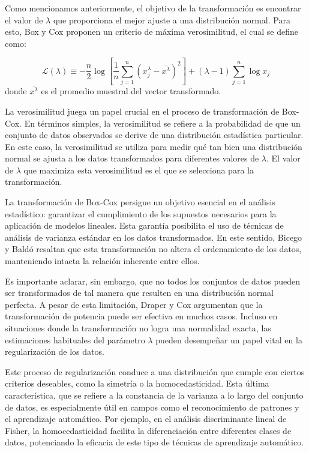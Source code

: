     Como mencionamos anteriormente, el objetivo de la transformaci\'on es encontrar el valor de $\lambda$ que proporciona el mejor ajuste a una distribuci\'on normal. Para esto, Box y Cox proponen un criterio de m\'axima verosimilitud, el cual se define como:

    \begin{equation}
        \mathcal{L}(\lambda) \equiv-\frac{n}{2} \log \left[\frac{1}{n} \sum_{j=1}^{n}\left(x_{j}^{\lambda}-\overline{x^{\lambda}}\right)^{2}\right] +(\lambda-1) \sum_{j=1}^{n} \log x_{j}
    \end{equation}
    donde $\overline{x^{\lambda}}$ es el promedio muestral del vector transformado.

    La verosimilitud juega un papel crucial en el proceso de transformaci\'on de Box-Cox. En t\'erminos simples, la verosimilitud se refiere a la probabilidad de que un conjunto de datos observados se derive de una distribuci\'on estad\'istica particular. En este caso, la verosimilitud se utiliza para medir qu\'e tan bien una distribuci\'on normal se ajusta a los datos transformados para diferentes valores de $\lambda$. El valor de $\lambda$ que maximiza esta verosimilitud es el que se selecciona para la transformaci\'on.

    
    La transformaci\'on de Box-Cox persigue un objetivo esencial en el an\'alisis estad\'istico: garantizar el cumplimiento de los supuestos necesarios para la aplicaci\'on de modelos lineales. Esta garant\'ia posibilita el uso de t\'ecnicas de an\'alisis de varianza est\'andar en los datos transformados. En este sentido, Bicego y Bald\'o \cite{bicego2016} resaltan que esta transformaci\'on no altera el ordenamiento de los datos, manteniendo intacta la relaci\'on inherente entre ellos.

    Es importante aclarar, sin embargo, que no todos los conjuntos de datos pueden ser transformados de tal manera que resulten en una distribuci\'on normal perfecta. A pesar de esta limitaci\'on, Draper y Cox \cite{draper1969} argumentan que la transformaci\'on de potencia puede ser efectiva en muchos casos. Incluso en situaciones donde la transformaci\'on no logra una normalidad exacta, las estimaciones habituales del par\'ametro $\lambda$ pueden desempe\~nar un papel vital en la regularizaci\'on de los datos.

    Este proceso de regularizaci\'on conduce a una distribuci\'on que cumple con ciertos criterios deseables, como la simetr\'ia o la homocedasticidad. Esta \'ultima caracter\'istica, que se refiere a la constancia de la varianza a lo largo del conjunto de datos, es especialmente \'util en campos como el reconocimiento de patrones y el aprendizaje autom\'atico. Por ejemplo, en el an\'alisis discriminante lineal de Fisher, la homocedasticidad facilita la diferenciaci\'on entre diferentes clases de datos, potenciando la eficacia de este tipo de t\'ecnicas de aprendizaje autom\'atico.



